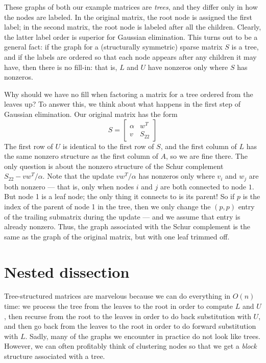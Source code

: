 \documentclass[12pt, leqno]{article}
\begin{document}
These graphs of both our example matrices are {\em trees}, and they
differ only in how the nodes are labeled.  In the original matrix, the
root node is assigned the first label; in the second matrix, the root
node is labeled after all the children.  Clearly, the latter label
order is superior for Gaussian elimination.  This turns out to be a
general fact: if the graph for a (structurally symmetric) sparse
matrix $S$ is a tree, and if the labels are ordered so that each node
appears after any children it may have, then there is no fill-in: that
is, $L$ and $U$ have nonzeros only where $S$ has nonzeros.

Why should we have no fill when factoring a matrix for a tree ordered
from the leaves up?  To answer this, we think about what happens in the
first step of Gaussian elimination.  Our original matrix has the form
\[
  S = \begin{bmatrix} \alpha & w^T \\ v & S_{22} \end{bmatrix}
\]
The first row of $U$ is identical to the first row of $S$,
and the first column of $L$ has the same nonzero structure
as the first column of $A$, so we are fine there.
The only question is about the nonzero structure of the Schur
complement $S_{22}-vw^T/\alpha$.  Note that the update $vw^T/\alpha$
has nonzeros only where $v_i$ and $w_j$ are both nonzero --- that is,
only when nodes $i$ and $j$ are both connected to node $1$.  But node
1 is a leaf node; the only thing it connects to is its parent!  So if
$p$ is the index of the parent of node 1 in the tree, then we only
change the $(p,p)$ entry of the trailing submatrix during the update
--- and we assume that entry is already nonzero.  Thus, the graph
associated with the Schur complement is the same as the graph of the
original matrix, but with one leaf trimmed off.

\section{Nested dissection}

Tree-structured matrices are marvelous because we can do everything in
$O(n)$ time: we process the tree from the leaves to the root in order
to compute $L$ and $U$, then recurse from the root to the leaves in
order to do back substitution with $U$, and then go back from the
leaves to the root in order to do forward substitution with $L$.
Sadly, many of the graphs we encounter in practice do not look like trees.
However, we can often profitably think of clustering nodes so that we get
a {\em block} structure associated with a tree.
\end{document}
